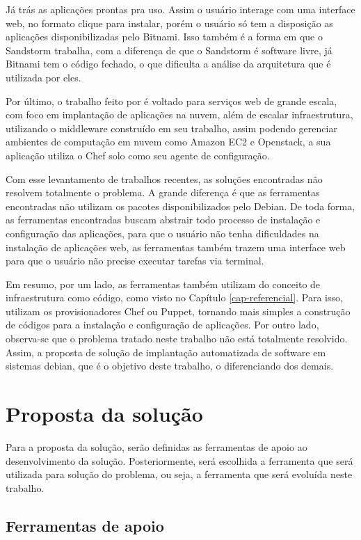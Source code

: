 Já  trás as aplicações prontas pra uso. Assim o usuário interage com 
uma interface web, no formato clique para instalar, porém
o usuário só tem a disposição as aplicações disponibilizadas pelo Bitnami. Isso
também é a forma em que o Sandstorm trabalha, com a diferença de que o Sandstorm é
software livre, já Bitnami tem o código fechado, o que dificulta a análise da arquitetura
que é utilizada por eles. 

Por último, o trabalho feito por  é voltado
para serviços web de grande escala, com foco em implantação de aplicações na
nuvem, além  de escalar infraestrutura, utilizando o middleware construído em seu trabalho, 
assim podendo gerenciar ambientes de computação em nuvem como Amazon EC2 e 
Openstack, a sua aplicação utiliza o Chef solo como seu agente de configuração.

Com esse levantamento de trabalhos recentes, as soluções encontradas não resolvem totalmente
o problema. A grande diferença é que as ferramentas encontradas não utilizam os pacotes
disponibilizados pelo Debian. De toda forma, as ferramentas encontradas buscam
abstrair todo processo de instalação e configuração das aplicações, para que o
usuário não tenha dificuldades na instalação de aplicações web, as ferramentas também
trazem uma interface web para que o usuário não precise executar tarefas via terminal.

Em resumo, por um lado, as ferramentas também utilizam do conceito de
infraestrutura como código, como visto no Capítulo \ref{cap-referencial}. Para
isso, utilizam os provisionadores Chef ou Puppet, tornando mais simples a
construção de códigos para a instalação e configuração de aplicações. Por outro lado, 
observa-se que o problema tratado neste trabalho não está totalmente resolvido. Assim, 
a proposta de solução de implantação automatizada de software em sistemas debian, que é o objetivo deste trabalho, 
o diferenciando dos demais.

\section{Proposta da solução}
\label{section:construcao}

Para a proposta da solução, serão definidas as ferramentas
de apoio ao desenvolvimento da solução. Posteriormente, será escolhida a ferramenta
que será utilizada para solução do problema, ou seja, a ferramenta que será evoluída
neste trabalho.

\subsection{Ferramentas de apoio}

